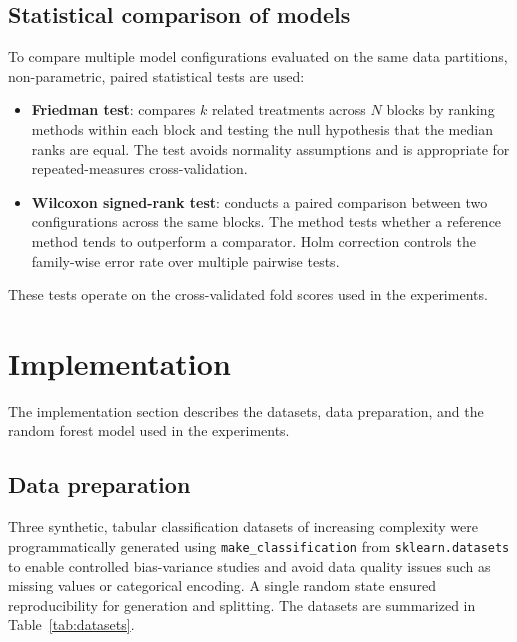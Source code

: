 \documentclass[conference]{IEEEtran}
\begin{document}
\subsection{Statistical comparison of models}
To compare multiple model configurations evaluated on the same data partitions, non-parametric, paired statistical tests are used:
\begin{itemize}
  \item \textbf{Friedman test}: compares $k$ related treatments across $N$ blocks by ranking methods within each block and testing the null hypothesis that the median ranks are equal. The test avoids normality assumptions and is appropriate for repeated-measures cross-validation.
  \item \textbf{Wilcoxon signed-rank test}: conducts a paired comparison between two configurations across the same blocks. The method tests whether a reference method tends to outperform a comparator. Holm correction controls the family-wise error rate over multiple pairwise tests.
\end{itemize}
These tests operate on the cross-validated fold scores used in the experiments.


\section{Implementation}
The implementation section describes the datasets, data preparation, and the random forest model used in the experiments.

\subsection{Data preparation}
Three synthetic, tabular classification datasets of increasing complexity were programmatically generated using \texttt{make\_classification} from \texttt{sklearn.datasets} \cite{scikit-learn} to enable controlled bias-variance studies and avoid data quality issues such as missing values or categorical encoding. A single random state ensured reproducibility for generation and splitting. The datasets are summarized in Table~\ref{tab:datasets}.

\begin{table}[H]
  \centering
  \footnotesize
  \caption{Summary of synthetic datasets used in experiments. The informative and redundant features are specified to control complexity. Class overlap and label noise increase with complexity.}
  \label{tab:datasets}
\end{table}
\end{document}
